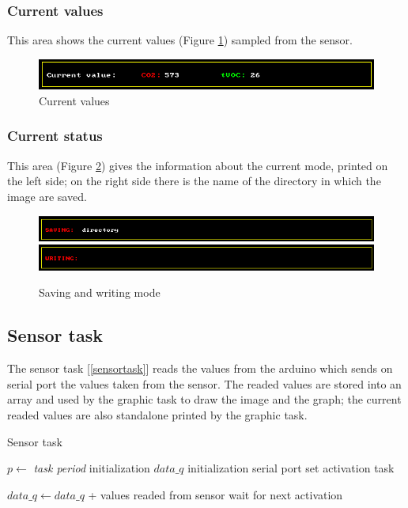 \documentclass[12pt]{article}
\begin{document}
\subsubsection*{Current values}
This area shows the current values (Figure \ref{values}) sampled from the sensor.

\begin{figure}[H]
    \centering
    \includegraphics[scale=0.75]{images/values.png}
    \caption{Current values}
    \label{values}
\end{figure}

\subsubsection*{Current status}
This area (Figure \ref{save_write}) gives the information about the current
mode, printed on the left side; on the right side there is the name of the
directory in which the image are saved.

\begin{figure}[h]
    \centering
    \includegraphics[scale=0.75]{images/saving.png}
    \includegraphics[scale=0.75]{images/writing.png}
    \caption{Saving and writing mode}
    \label{save_write}
\end{figure}

\subsection{Sensor task}
The sensor task [\ref{sensortask}] reads the values from the arduino which
sends on serial port the values taken from the sensor. The readed values are
stored into an array and used by the graphic task to draw the image and the
graph; the current readed values are also standalone printed by the graphic
task.

\begin{algorithm}[H]
\caption{Sensor task}
\label{sensortask}

\begin{algorithmic}
\State $p\gets$ \textit{task period}
\State initialization $data\_q$
\State initialization serial port
\State set activation task

\Loop
\State $data\_q\gets data\_q$ + values readed from sensor
\State wait for next activation
\EndLoop

\end{algorithmic}
\end{algorithm}
\end{document}
